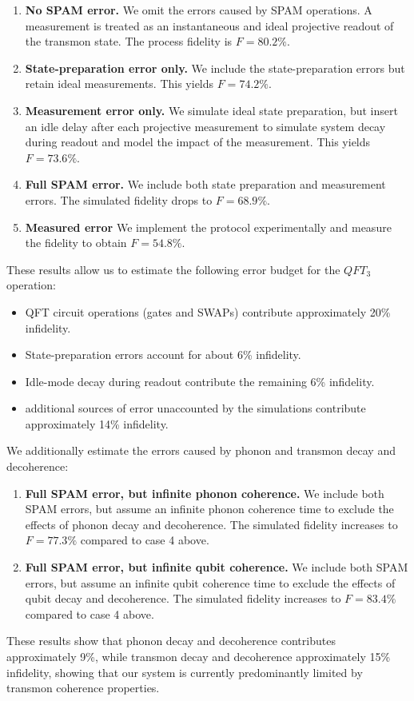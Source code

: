 \documentclass[12pt]{article}
\begin{document}
\begin{enumerate}
  \item \textbf{No SPAM error.}  We omit the errors caused by SPAM operations.  A measurement is treated as an instantaneous and ideal projective readout of the transmon state.  The process fidelity is
  \( F = 80.2\%.\)


  \item \textbf{State-preparation error only.}  We include the state-preparation errors but retain ideal measurements.  This yields
  \(F = 74.2\%.\)

  \item \textbf{Measurement error only.}  We simulate ideal state preparation, but insert an idle delay after each projective measurement to simulate system decay during readout and model the impact of the measurement. This yields
  \(F = 73.6\%.\)

  \item \textbf{Full SPAM error.}  We include both state preparation and measurement errors. The simulated fidelity drops to
  \(F = 68.9\%.\)

  \item \textbf{Measured error} We implement the protocol experimentally and measure the fidelity to obtain \(F = 54.8\%.\)
\end{enumerate}
These results allow us to estimate the following error budget for the $QFT_3$ operation:
\begin{itemize}
  \item QFT circuit operations (gates and SWAPs) contribute approximately 20\% infidelity.
  \item State-preparation errors account for about 6\% infidelity.
  \item Idle-mode decay during readout contribute the remaining 6\% infidelity.
  \item additional sources of error unaccounted by the simulations contribute approximately 14\% infidelity.
\end{itemize}
We additionally estimate the errors caused by phonon and transmon decay and decoherence:
\begin{enumerate}

 \item \textbf{Full SPAM error, but infinite phonon coherence.} We include both SPAM errors, but assume an infinite phonon coherence time to exclude the effects of phonon decay and decoherence. The simulated fidelity increases to \( F = 77.3\%  \) compared to case 4 above.

  \item \textbf{Full SPAM error, but infinite qubit coherence.} We include both SPAM errors, but assume an infinite qubit coherence time to exclude the effects of qubit decay and decoherence. The simulated fidelity increases to \( F = 83.4\%  \) compared to case 4 above.
\end{enumerate}
These results show that phonon decay and decoherence contributes approximately 9\%, while transmon decay and decoherence approximately 15\% infidelity, showing that our system is currently predominantly limited by transmon coherence properties.
\end{document}
